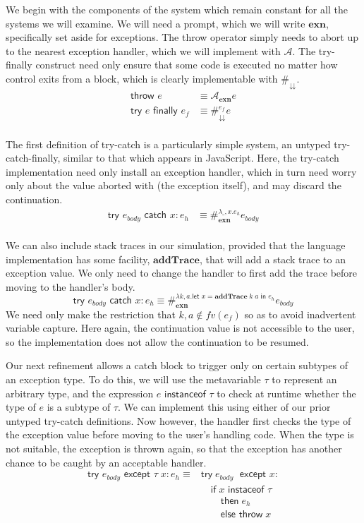 \documentclass[11pt]{article}
\newcommand{\letin}[2]{\textsf{let }#1\textsf{ in }#2}
\newcommand\A{\mathcal{A}}
\begin{document}
We begin with the components of the system which remain constant for all the systems we will examine.
We will need a prompt, which we will write $\mathbf{exn}$, specifically set aside for exceptions.
The throw operator simply needs to abort up to the nearest exception handler, which we will implement with $\A$.
The try-finally construct need only ensure that some code is executed no matter how control exits from a block, which is clearly implementable with $\#_\downdownarrows$.
\begin{align*}
\textsf{throw }e &\equiv \A_\textbf{exn}e \\
\textsf{try }e\textsf{ finally }e_f &\equiv
	\#_\downdownarrows^{e_f}e \\
\end{align*}

The first definition of try-catch is a particularly simple system, an untyped try-catch-finally, similar to that which appears in JavaScript.
Here, the try-catch implementation need only install an exception handler, which in turn need worry only about the value aborted with (the exception itself), and may discard the continuation.
\begin{align*}
\textsf{try }e_{body}\textsf{ catch }x:e_h &\equiv
	\#_\textbf{exn}^{\lambda \_,x.{e_h}}e_{body}
	\\
\end{align*}

We can also include stack traces in our simulation, provided that the language implementation has some facility, $\mathbf{addTrace}$, that will add a stack trace to an exception value.
We only need to change the handler to first add the trace before moving to the handler's body.
$$\textsf{try }e_{body}\textsf{ catch }x:e_h \equiv
	\#_\textbf{exn}^{\lambda k,a.{\letin{x=\mathbf{addTrace}\;k\;a}{e_h}}}e_{body}$$
We need only make the restriction that $k,a \notin fv(e_f)$ so as to avoid inadvertent variable capture.
Here again, the continuation value is not accessible to the user, so the implementation does not allow the continuation to be resumed.

\newpage
Our next refinement allows a catch block to trigger only on certain subtypes of an exception type.
To do this, we will use the metavariable $\tau$ to represent an arbitrary type, and the expression $e\textsf{ instanceof }\tau$ to check at runtime whether the type of $e$ is a subtype of $\tau$.
We can implement this using either of our prior untyped try-catch definitions.
Now however, the handler first checks the type of the exception value before moving to the user's handling code.
When the type is not suitable, the exception is thrown again, so that the exception has another chance to be caught by an acceptable handler.
\begin{align*}
\textsf{try }e_{body}\textsf{ except }\tau\;x:e_h \equiv{}
	&\textsf{try}\;e_{body}\;\textsf{ except }x: \\
	&\quad\textsf{if}\;x\textsf{ instaceof }\tau\\
	&\qquad\textsf{then}\;e_h \\
	&\qquad\textsf{else throw}\;x \\
\end{align*}
\end{document}
